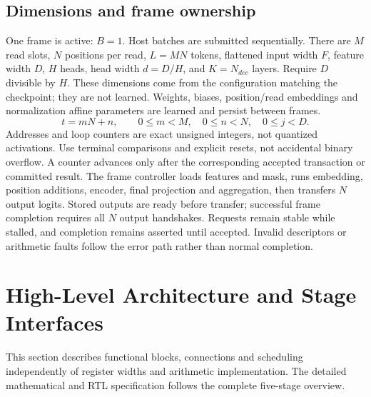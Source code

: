 \documentclass[11pt,a4paper]{article}
\begin{document}
\subsection{Dimensions and frame ownership}
One frame is active: $B=1$. Host batches are submitted sequentially. There are $M$ read slots, $N$ positions per read, $L=MN$ tokens, flattened input width $F$, feature width $D$, $H$ heads, head width $d=D/H$, and $K=N_{dec}$ layers. Require $D$ divisible by $H$. These dimensions come from the configuration matching the checkpoint; they are not learned. Weights, biases, position/read embeddings and normalization affine parameters are learned and persist between frames.
\[
t=mN+n,\qquad 0\leq m<M,\quad 0\leq n<N,\quad 0\leq j<D.
\]
Addresses and loop counters are exact unsigned integers, not quantized activations. Use terminal comparisons and explicit resets, not accidental binary overflow. A counter advances only after the corresponding accepted transaction or committed result.
The frame controller loads features and mask, runs embedding, position additions, encoder, final projection and aggregation, then transfers $N$ output logits. Stored outputs are ready before transfer; successful frame completion requires all $N$ output handshakes. Requests remain stable while stalled, and completion remains asserted until accepted. Invalid descriptors or arithmetic faults follow the error path rather than normal completion.

\section{High-Level Architecture and Stage Interfaces}
This section describes functional blocks, connections and scheduling independently of register widths and arithmetic implementation. The detailed mathematical and RTL specification follows the complete five-stage overview.

\begin{center}
\end{center}
\end{document}
